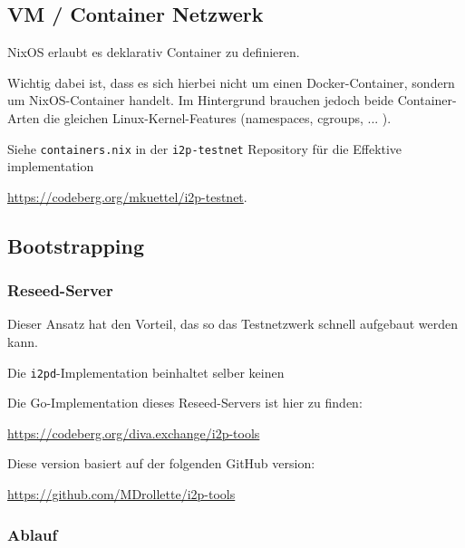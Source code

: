 \subsection{VM / Container Netzwerk}

NixOS erlaubt es deklarativ Container zu definieren.

%

Wichtig dabei ist, dass es sich hierbei nicht um einen Docker-Container, sondern um NixOS-Container handelt.
Im Hintergrund brauchen jedoch beide Container-Arten die gleichen Linux-Kernel-Features (namespaces, cgroups, ... ).


Siehe \lstinline|containers.nix| in der \lstinline|i2p-testnet| Repository für die Effektive implementation


\url{https://codeberg.org/mkuettel/i2p-testnet}.

\subsection{Bootstrapping}

\subsubsection{Reseed-Server}

Dieser Ansatz hat den Vorteil, das so das Testnetzwerk schnell aufgebaut werden kann.

Die \lstinline|i2pd|-Implementation beinhaltet selber keinen 

Die Go-Implementation dieses Reseed-Servers ist hier zu finden:

\url{https://codeberg.org/diva.exchange/i2p-tools}

Diese version basiert auf der folgenden GitHub version:

\url{https://github.com/MDrollette/i2p-tools}

\subsubsection{Ablauf}


